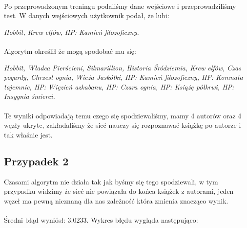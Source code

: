         \paragraph{}
            Po przeprowadzonym treningu podaliśmy dane wejściowe i przeprowadziliśmy test.
            W danych wejściowych użytkownik podał, że lubi:

            \textit{
                Hobbit, Krew elfów, HP: Kamień filozoficzny.
            }
        \paragraph{}
            Algorytm określił że mogą spodobać mu się:

            \textit{
                Hobbit, Władca Pierścieni, Silmarillion, Historia Śródziemia,
                Krew elfów, Czas pogardy, Chrzest ognia, Wieża Jaskółki, HP: Kamień filozoficzny,
                HP: Komnata tajemnic, HP: Więzień azkabanu, HP: Czara ognia, HP: Książę półkrwi,
                HP: Insygnia śmierci.
            }

        \paragraph{}
            Te wyniki odpowiadają temu czego się spodziewaliśmy, mamy 4 autorów oraz
            4 węzły ukryte, zakładaliśmy że sieć nauczy się rozpoznawać książkę po autorze i
            tak właśnie jest.

    \subsection{Przypadek 2}
        Czasami algorytm nie działa tak jak byśmy się tego spodziewali, w tym przypadku
        widzimy że sieć nie powiązała do końca książek z autorami, jeden węzeł ma pewną
        nieznaną dla nas zależność która zmienia znacząco wynik.

        \paragraph{}
            Średni błąd wyniósł: $3.0233$. Wykres błędu wygląda następująco:

